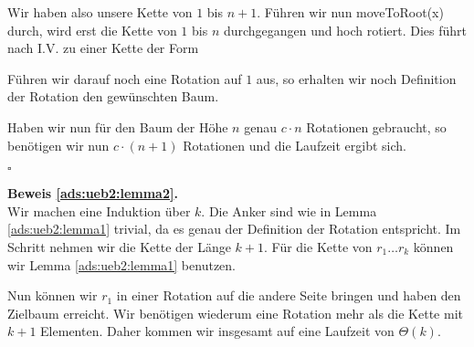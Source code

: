 \documentclass[11pt,a4paper,ngerman]{article}
\begin{document}
Wir haben also unsere Kette von $1$ bis $n+1$. Führen wir nun moveToRoot(x) durch, wird erst die Kette von $1$ bis $n$ durchgegangen und hoch rotiert.
Dies führt nach I.V. zu einer Kette der Form 

   \begin{center}
   \end{center}

Führen wir darauf noch eine Rotation auf $1$ aus, so erhalten wir noch Definition der Rotation den gewünschten Baum.

Haben wir nun für den Baum der Höhe $n$ genau $c \cdot n$ Rotationen gebraucht, so benötigen wir nun $c \cdot (n+1)$ Rotationen und die Laufzeit ergibt sich.

\mbox{}\hfill$\square$

\noindent\textbf{Beweis \ref{ads:ueb2:lemma2}.}\\
Wir machen eine Induktion über $k$. Die Anker sind wie in Lemma \ref{ads:ueb2:lemma1} trivial, da es genau der Definition der Rotation entspricht. Im Schritt
nehmen wir die Kette der Länge $k+1$. Für die Kette von $r_1 \ldots r_k$ können wir Lemma \ref{ads:ueb2:lemma1} benutzen.
 
      \begin{center}  
      \end{center} 
Nun können wir $r_1$ in einer Rotation auf die andere Seite bringen und haben den Zielbaum erreicht. Wir benötigen wiederum eine Rotation mehr als die Kette mit $k+1$ Elementen. Daher kommen wir insgesamt auf eine Laufzeit von $\Theta(k)$.
\end{document}
